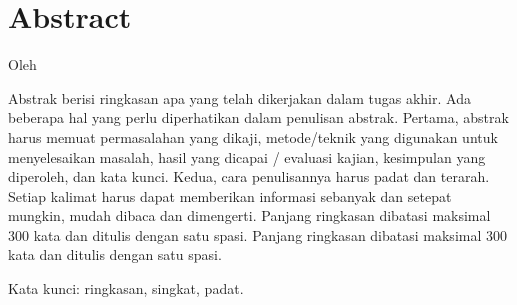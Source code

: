 \chapter*{Abstract}

\begin{center}
	\center
	\begin{doublespace}
		\Large \bfseries \MakeUppercase{\thetitleinenglish}

		\normalfont \normalsize
		Oleh

		\theauthor
	\end{doublespace}
\end{center}

\begin{singlespace}
	Abstrak berisi ringkasan apa yang telah dikerjakan dalam tugas akhir. Ada
	beberapa hal yang perlu diperhatikan dalam penulisan abstrak. Pertama,
	abstrak harus memuat permasalahan yang dikaji, metode/teknik yang digunakan
	untuk menyelesaikan masalah, hasil yang dicapai / evaluasi kajian,
	kesimpulan yang diperoleh, dan kata kunci. Kedua, cara penulisannya harus
	padat dan terarah. Setiap kalimat harus dapat memberikan informasi sebanyak
	dan setepat mungkin, mudah dibaca dan dimengerti. Panjang ringkasan dibatasi
	maksimal 300 kata dan ditulis dengan satu spasi. Panjang ringkasan dibatasi
	maksimal 300 kata dan ditulis dengan satu spasi.

	Kata kunci: ringkasan, singkat, padat.
\end{singlespace}

\clearpage
